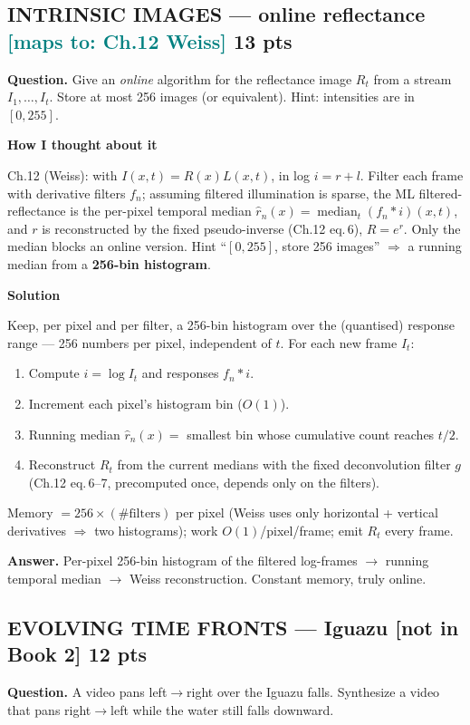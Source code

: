 \documentclass[11pt]{article}
\newcommand{\step}[1]{\smallskip\par\noindent\textbf{\textcolor{amber}{#1}}\par\nobreak}
\newcommand{\maps}[1]{{\small\textcolor{teal}{[maps to: #1]}}}
\newcommand{\mapsoob}[1]{{\small\textcolor{oob}{[#1]}}}
\newcommand{\ans}[1]{\begin{answer}\textbf{Answer.} #1\end{answer}}
\begin{document}
\subsection{INTRINSIC IMAGES --- online reflectance \hfill \maps{Ch.12 Weiss} \hfill \textnormal{\small 13 pts}}
\begin{qbox}\textbf{Question.} Give an \emph{online} algorithm for the reflectance image $R_t$ from a stream
$I_1,\dots,I_t$. Store at most 256 images (or equivalent). Hint: intensities are in $[0,255]$.\end{qbox}

\step{How I thought about it}
Ch.12 (Weiss): with $I(x,t)=R(x)L(x,t)$, in log $i=r+l$. Filter each frame with derivative filters $f_n$;
assuming filtered illumination is sparse, the ML filtered-reflectance is the per-pixel temporal median
$\hat r_n(x)=\operatorname{median}_t (f_n*i)(x,t)$, and $r$ is reconstructed by the fixed pseudo-inverse
(Ch.12 eq.\,6), $R=e^{r}$. Only the median blocks an online version. Hint ``$[0,255]$, store 256 images'' $\Rightarrow$
a running median from a \textbf{256-bin histogram}.

\step{Solution}
Keep, per pixel and per filter, a 256-bin histogram over the (quantised) response range --- 256 numbers per
pixel, independent of $t$. For each new frame $I_t$:
\begin{enumerate}
  \item Compute $i=\log I_t$ and responses $f_n*i$.
  \item Increment each pixel's histogram bin ($O(1)$).
  \item Running median $\hat r_n(x)=$ smallest bin whose cumulative count reaches $t/2$.
  \item Reconstruct $R_t$ from the current medians with the fixed deconvolution filter $g$ (Ch.12 eq.\,6--7,
  precomputed once, depends only on the filters).
\end{enumerate}
Memory $=256\times(\#\text{filters})$ per pixel (Weiss uses only horizontal + vertical derivatives $\Rightarrow$
two histograms); work $O(1)$/pixel/frame; emit $R_t$ every frame.
\ans{Per-pixel 256-bin histogram of the filtered log-frames $\to$ running temporal median $\to$ Weiss
reconstruction. Constant memory, truly online.}

\subsection{EVOLVING TIME FRONTS --- Iguazu \hfill \mapsoob{not in Book 2} \hfill \textnormal{\small 12 pts}}
\begin{qbox}\textbf{Question.} A video pans left$\to$right over the Iguazu falls. Synthesize a video that pans
right$\to$left while the water still falls downward.\end{qbox}
\end{document}
